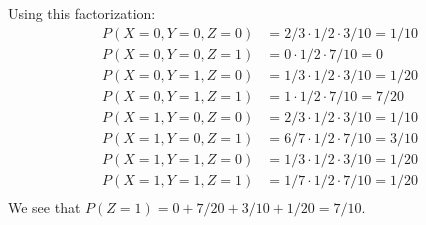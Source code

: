 \documentclass{article}
\begin{document}
Using this factorization:
\begin{align*}
    P(X = 0, Y = 0, Z = 0) & = 2/3 \cdot 1/2 \cdot 3/10 = 1/10 \\
    P(X = 0, Y = 0, Z = 1) & = 0 \cdot 1/2 \cdot 7/10 = 0 \\
    P(X = 0, Y = 1, Z = 0) & = 1/3 \cdot 1/2 \cdot 3/10 = 1/20 \\
    P(X = 0, Y = 1, Z = 1) & = 1 \cdot 1/2 \cdot 7/10 = 7/20 \\
    P(X = 1, Y = 0, Z = 0) & = 2/3 \cdot 1/2 \cdot 3/10 = 1/10 \\
    P(X = 1, Y = 0, Z = 1) & = 6/7 \cdot 1/2 \cdot 7/10 = 3/10 \\
    P(X = 1, Y = 1, Z = 0) & = 1/3 \cdot 1/2 \cdot 3/10 = 1/20 \\
    P(X = 1, Y = 1, Z = 1) & = 1/7 \cdot 1/2 \cdot 7/10 = 1/20 \\
\end{align*}
We see that $P(Z = 1) = 0 + 7/20 + 3/10 + 1/20 = 7/10$.
\end{document}
